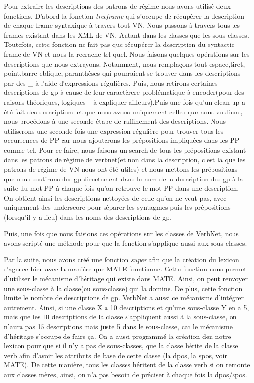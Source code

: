 \documentclass[12pt,maitrise,frenchb,natbib,twoside,initial]{dms}
\numberwithin{equation}{section}
\numberwithin{table}{chapter}
\numberwithin{figure}{chapter}
\begin{document}
Pour extraire les descriptions des patrons de régime nous avons utilisé deux fonctions. D'abord la fonction \emph{treeframe} qui s'occupe de récupérer la description de chaque frame syntaxique à travers tout VN. Nous passons à travers tous les frames existant dans les XML de VN. Autant dans les classes que les sous-classes. Toutefois, cette fonction ne fait pas que récupérer la description du syntactic frame de VN et nous la recrache tel quel. Nous faisons quelques opérations sur les descriptions que nous extrayons. Notamment, nous remplaçons tout espace,tiret, point,barre oblique, paranthèses qui pourraient se trouver dans les descriptions par des {\_} à l'aide d'expressions régulières. Puis, nous retirons certaines descriptions de gp à cause de leur caractèrere problématique à encoder(pour des raisons théoriques, logiques -- à expliquer ailleurs).Puis une fois qu'un clean up a été fait des descriptions et que nous avons uniquement celles que nous voulions, nous procédons à une seconde étape de raffinement des descriptions. Nous utiliserons une seconde fois une expression régulière pour trouver tous les occurrences de PP car nous ajouterons les prépositions impliquées dans les PP comme tel. Pour ce faire, nous faisons un search de tous les prépositions existant dans les patrons de régime de verbnet(et non dans la description, c'est là que les patrons de régime de VN nous ont été utiles) et nous mettons les prépositions que nous soutirons des gp directement dans le nom de la description des gp à la suite du mot PP à chaque fois qu'on retrouve le mot PP dans une description. On obtient ainsi les descriptions nettoyées de celle qu'on ne veut pas, avec uniquement des underscore pour séparer les syntagmes puis les prépositions (lorsqu'il y a lieu) dans les noms des descriptions de gp.

Puis, une fois que nous faisions ces opérations sur les classes de VerbNet, nous avons scripté une méthode pour que la fonction s'applique aussi aux sous-classes.

Par la suite, nous avons créé une fonction \emph{super} afin que la création du lexicon s'agence bien avec la manière que MATE fonctionne. Cette fonction nous permet d'utiliser le mécanisme d'héritage qui existe dans MATE. Ainsi, on peut renvoyer une sous-classe à la classe(ou sous-classe) qui la domine. De plus, cette fonction limite le nombre de descriptions de gp. VerbNet a aussi ce mécanisme d'intégrer autrement. Ainsi, si une classe X a 10 descriptions et qu'une sous-classe Y en a 5, mais que les 10 descriptions de la classe s'appliquent aussi à la sous-classe, on n'aura pas 15 descriptions mais juste 5 dans le sous-classe, car le mécanisme d'héritage s'occupe de faire ça. On a aussi programmé la création den notre lexicon pour que si il n'y a pas de sous-classes, que la classe hérite de la classe verb afin d'avoir les attributs de base de cette classe (la dpos, la spos, voir MATE). De cette manière, tous les classes héritent de la classe verb si on remonte aux classes mères, ainsi, on n'a pas besoin de préciser à chaque fois la dpos/spos.
\end{document}

